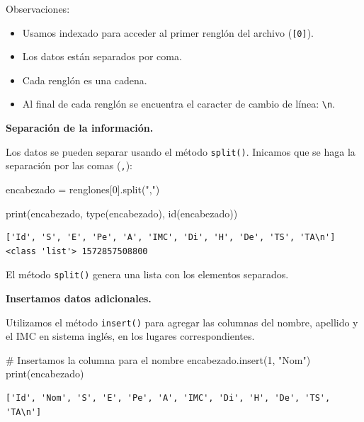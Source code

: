 \documentclass[
  spanish,
  letterpaper,
]{scrbook}
\newenvironment{Shaded}{\begin{snugshade}}{\end{snugshade}}
\newcommand{\BuiltInTok}[1]{\textcolor[rgb]{0.00,0.23,0.31}{#1}}
\newcommand{\CommentTok}[1]{\textcolor[rgb]{0.37,0.37,0.37}{#1}}
\newcommand{\DecValTok}[1]{\textcolor[rgb]{0.68,0.00,0.00}{#1}}
\newcommand{\NormalTok}[1]{\textcolor[rgb]{0.00,0.23,0.31}{#1}}
\newcommand{\OperatorTok}[1]{\textcolor[rgb]{0.37,0.37,0.37}{#1}}
\newcommand{\StringTok}[1]{\textcolor[rgb]{0.13,0.47,0.30}{#1}}
\providecommand{\tightlist}{%
  \setlength{\itemsep}{0pt}\setlength{\parskip}{0pt}}
\theoremstyle{definition}
\theoremstyle{remark}
\begin{document}
Observaciones:

\begin{itemize}
\tightlist
\item
  Usamos indexado para acceder al primer renglón del archivo
  (\texttt{{[}0{]}}).
\item
  Los datos están separados por coma.
\item
  Cada renglón es una cadena.
\item
  Al final de cada renglón se encuentra el caracter de cambio de línea:
  \texttt{\textbackslash{}n}.
\end{itemize}

\textbf{Separación de la información.}

Los datos se pueden separar usando el método \texttt{split()}. Inicamos
que se haga la separación por las comas (\texttt{,}):

\begin{Shaded}
\begin{Highlighting}[]
\NormalTok{encabezado }\OperatorTok{=}\NormalTok{ renglones[}\DecValTok{0}\NormalTok{].split(}\StringTok{","}\NormalTok{)}

\BuiltInTok{print}\NormalTok{(encabezado, }\BuiltInTok{type}\NormalTok{(encabezado), }\BuiltInTok{id}\NormalTok{(encabezado))}
\end{Highlighting}
\end{Shaded}

\begin{verbatim}
['Id', 'S', 'E', 'Pe', 'A', 'IMC', 'Di', 'H', 'De', 'TS', 'TA\n'] <class 'list'> 1572857508800
\end{verbatim}

El método \texttt{split()} genera una lista con los elementos separados.

\textbf{Insertamos datos adicionales.}

Utilizamos el método \texttt{insert()} para agregar las columnas del
nombre, apellido y el IMC en sistema inglés, en los lugares
correspondientes.

\begin{Shaded}
\begin{Highlighting}[]
\CommentTok{\# Insertamos la columna para el nombre}
\NormalTok{encabezado.insert(}\DecValTok{1}\NormalTok{, }\StringTok{"Nom"}\NormalTok{)}
\BuiltInTok{print}\NormalTok{(encabezado)}
\end{Highlighting}
\end{Shaded}

\begin{verbatim}
['Id', 'Nom', 'S', 'E', 'Pe', 'A', 'IMC', 'Di', 'H', 'De', 'TS', 'TA\n']
\end{verbatim}
\end{document}
